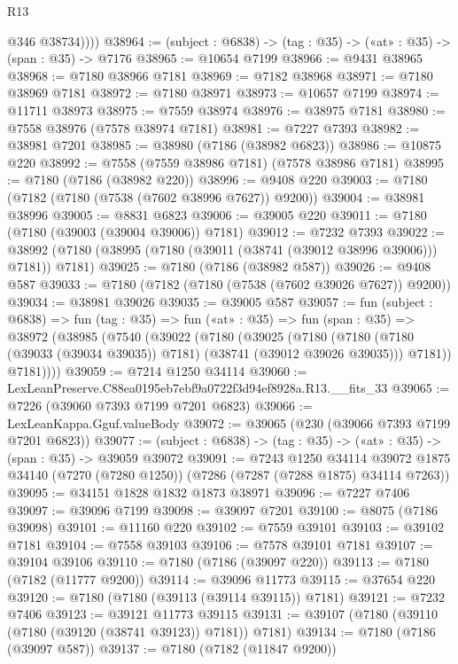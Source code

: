 \begin{lexlean}{R13}
\begin{coremodule}
            @346
            @38734))))
@38964 := (subject : @6838) -> (tag : @35) -> («at» : @35) -> (span : @35) -> @7176
@38965 := @10654 @7199
@38966 := @9431 @38965
@38968 := @7180 @38966 @7181
@38969 := @7182 @38968
@38971 := @7180 @38969 @7181
@38972 := @7180 @38971
@38973 := @10657 @7199
@38974 := @11711 @38973
@38975 := @7559 @38974
@38976 := @38975 @7181
@38980 := @7558 @38976 (@7578 @38974 @7181)
@38981 := @7227 @7393
@38982 := @38981 @7201
@38985 := @38980 (@7186 (@38982 @6823))
@38986 := @10875 @220
@38992 := @7558 (@7559 @38986 @7181) (@7578 @38986 @7181)
@38995 := @7180 (@7186 (@38982 @220))
@38996 := @9408 @220
@39003 := @7180 (@7182 (@7180 (@7538 (@7602 @38996 @7627)) @9200))
@39004 := @38981 @38996
@39005 := @8831 @6823
@39006 := @39005 @220
@39011 := @7180 (@7180 (@39003 (@39004 @39006)) @7181)
@39012 := @7232 @7393
@39022 := @38992 (@7180 (@38995 (@7180 (@39011 (@38741 (@39012 @38996 @39006))) @7181)) @7181)
@39025 := @7180 (@7186 (@38982 @587))
@39026 := @9408 @587
@39033 := @7180 (@7182 (@7180 (@7538 (@7602 @39026 @7627)) @9200))
@39034 := @38981 @39026
@39035 := @39005 @587
@39057 := fun (subject : @6838) =>
  fun (tag : @35) =>
  fun («at» : @35) =>
  fun (span : @35) =>
  @38972
    (@38985
      (@7540
        (@39022
          (@7180
            (@39025
              (@7180
                (@7180 (@7180 (@39033 (@39034 @39035)) @7181) (@38741 (@39012 @39026 @39035)))
                @7181))
            @7181))))
@39059 := @7214 @1250 @34114
@39060 := LexLeanPreserve.C88ea0195eb7ebf9a0722f3d94ef8928a.R13.__fits_33
@39065 := @7226 (@39060 @7393 @7199 @7201 @6823)
@39066 := LexLeanKappa.Gguf.valueBody
@39072 := @39065 (@230 (@39066 @7393 @7199 @7201 @6823))
@39077 := (subject : @6838) -> (tag : @35) -> («at» : @35) -> (span : @35) -> @39059 @39072
@39091 := @7243
    @1250
    @34114
    @39072
    @1875
    @34140
    (@7270 (@7280 @1250))
    (@7286 (@7287 (@7288 @1875) @34114 @7263))
@39095 := @34151 @1828 @1832 @1873 @38971
@39096 := @7227 @7406
@39097 := @39096 @7199
@39098 := @39097 @7201
@39100 := @8075 (@7186 @39098)
@39101 := @11160 @220
@39102 := @7559 @39101
@39103 := @39102 @7181
@39104 := @7558 @39103
@39106 := @7578 @39101 @7181
@39107 := @39104 @39106
@39110 := @7180 (@7186 (@39097 @220))
@39113 := @7180 (@7182 (@11777 @9200))
@39114 := @39096 @11773
@39115 := @37654 @220
@39120 := @7180 (@7180 (@39113 (@39114 @39115)) @7181)
@39121 := @7232 @7406
@39123 := @39121 @11773 @39115
@39131 := @39107 (@7180 (@39110 (@7180 (@39120 (@38741 @39123)) @7181)) @7181)
@39134 := @7180 (@7186 (@39097 @587))
@39137 := @7180 (@7182 (@11847 @9200))

\end{coremodule}
\end{lexlean}
